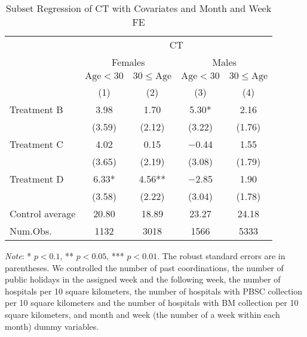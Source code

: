 \documentclass[12pt, a4paper]{article}
\begin{document}
\begin{table}[H]

\caption{\label{tab:test-lm-subset2}Subset Regression of CT with Covariates and Month and Week FE}
\centering
\fontsize{8}{10}\selectfont
\begin{threeparttable}
\begin{tabular}[t]{lcccc}
\toprule
\multicolumn{1}{c}{ } & \multicolumn{4}{c}{CT} \\
\cmidrule(l{3pt}r{3pt}){2-5}
\multicolumn{1}{c}{ } & \multicolumn{2}{c}{Females} & \multicolumn{2}{c}{Males} \\
\cmidrule(l{3pt}r{3pt}){2-3} \cmidrule(l{3pt}r{3pt}){4-5}
\multicolumn{1}{c}{ } & \multicolumn{1}{c}{$\text{Age} < 30$} & \multicolumn{1}{c}{$30 \le \text{Age}$} & \multicolumn{1}{c}{$\text{Age} < 30$} & \multicolumn{1}{c}{$30 \le \text{Age}$} \\
\cmidrule(l{3pt}r{3pt}){2-2} \cmidrule(l{3pt}r{3pt}){3-3} \cmidrule(l{3pt}r{3pt}){4-4} \cmidrule(l{3pt}r{3pt}){5-5}
  & (1) & (2) & (3) & (4)\\
\midrule
Treatment B & \num{3.98} & \num{1.70} & \num{5.30}* & \num{2.16}\\
 & (\num{3.59}) & (\num{2.12}) & (\num{3.22}) & (\num{1.76})\\
Treatment C & \num{4.02} & \num{0.15} & \num{-0.44} & \num{1.55}\\
 & (\num{3.65}) & (\num{2.19}) & (\num{3.08}) & (\num{1.79})\\
Treatment D & \num{6.33}* & \num{4.56}** & \num{-2.85} & \num{1.90}\\
 & (\num{3.58}) & (\num{2.22}) & (\num{3.04}) & (\num{1.78})\\
\midrule
Control average & 20.80 & 18.89 & 23.27 & 24.18\\
Num.Obs. & \num{1132} & \num{3018} & \num{1566} & \num{5333}\\
\bottomrule
\end{tabular}
\begin{tablenotes}
\item \emph{Note}: * $p < 0.1$, ** $p < 0.05$, *** $p < 0.01$. The robust standard errors are in parentheses. We controlled the number of past coordinations, the number of public holidays in the assigned week and the following week, the number of hospitals per 10 square kilometers, the number of hospitals with PBSC collection per 10 square kilometers and the number of hospitals with BM collection per 10 square kilometers, and month and week (the number of a week within each month) dummy variables.
\end{tablenotes}
\end{threeparttable}
\end{table}
\end{document}
